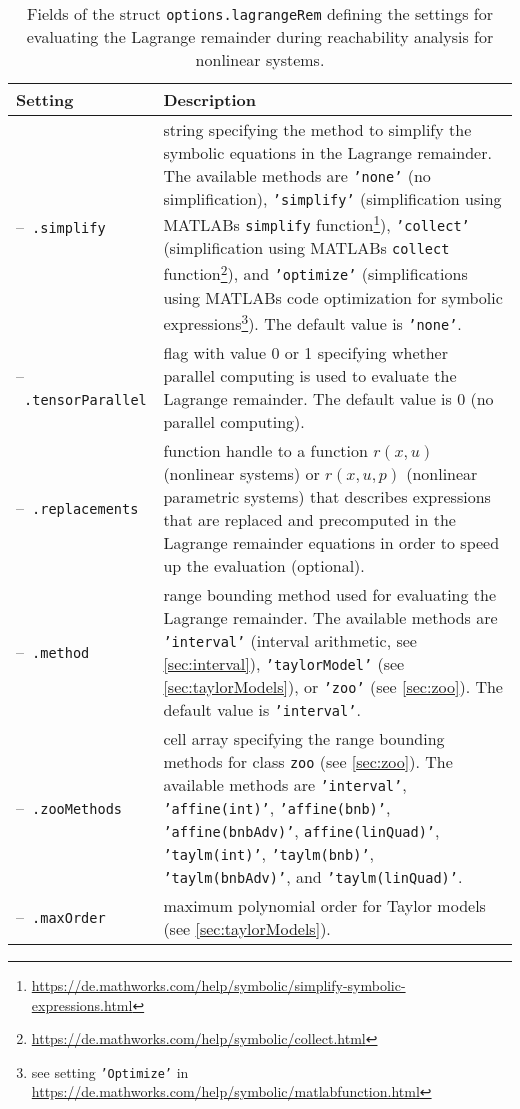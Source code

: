 \begin{table}
\centering
\renewcommand{\arraystretch}{1.3}
\caption{Fields of the struct \texttt{options.lagrangeRem} defining the settings for evaluating the Lagrange remainder during reachability analysis for nonlinear systems.}
\label{tab:settingsLagrangeRem}
\begin{tabular}{ l p{11cm} }	
\toprule
\textbf{Setting} & \textbf{Description} \\
\midrule
--~\texttt{.simplify} & string specifying the method to simplify the symbolic equations in the Lagrange remainder. The available methods are \texttt{'none'} (no simplification), \texttt{'simplify'} (simplification using MATLABs \texttt{simplify} function\footnote{\url{https://de.mathworks.com/help/symbolic/simplify-symbolic-expressions.html}}), \texttt{'collect'} (simplification using MATLABs \texttt{collect} function\footnote{\url{https://de.mathworks.com/help/symbolic/collect.html}}), and \texttt{'optimize'} (simplifications using MATLABs code optimization for symbolic expressions\footnote{see setting \texttt{'Optimize'} in \url{https://de.mathworks.com/help/symbolic/matlabfunction.html}}). The default value is \texttt{'none'}. \\
--~\texttt{.tensorParallel} & flag with value 0 or 1 specifying whether parallel computing is used to evaluate the Lagrange remainder. The default value is 0 (no parallel computing). \\
--~\texttt{.replacements} & function handle to a function $r(x,u)$ (nonlinear systems) or $r(x,u,p)$ (nonlinear parametric systems) that describes expressions that are replaced and precomputed in the Lagrange remainder equations in order to speed up the evaluation (optional).  \\
--~\texttt{.method} & range bounding method used for evaluating the Lagrange remainder. The available methods are \texttt{'interval'} (interval arithmetic, see \cref{sec:interval}), \texttt{'taylorModel'} (see \cref{sec:taylorModels}), or \texttt{'zoo'} (see \cref{sec:zoo}). The default value is \texttt{'interval'}. \\
--~\texttt{.zooMethods} & cell array specifying the range bounding methods for class \texttt{zoo} (see \cref{sec:zoo}). The available methods are \texttt{'interval'}, \texttt{'affine(int)'}, \texttt{'affine(bnb)'}, \texttt{'affine(bnbAdv)'}, \texttt{affine(linQuad)'}, \texttt{'taylm(int)'}, \texttt{'taylm(bnb)'}, \texttt{'taylm(bnbAdv)'}, and \texttt{'taylm(linQuad)'}. \\
--~\texttt{.maxOrder} & maximum polynomial order for Taylor models (see \cref{sec:taylorModels}). \\

\end{tabular}
\end{table}
